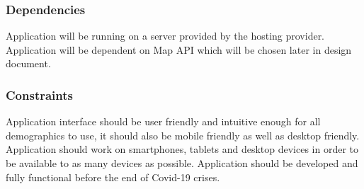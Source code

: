 \subsubsection{Dependencies}

Application will be running on a server provided by the hosting provider. Application will be dependent on Map API which will be chosen later in design document.

\subsubsection{Constraints}

Application interface should be user friendly and intuitive enough for all demographics to use, it should also be mobile friendly as well as desktop friendly. Application should work on smartphones, tablets and desktop devices in order to be available to as many devices as possible. Application should be developed and fully functional before the end of Covid-19 crises.
